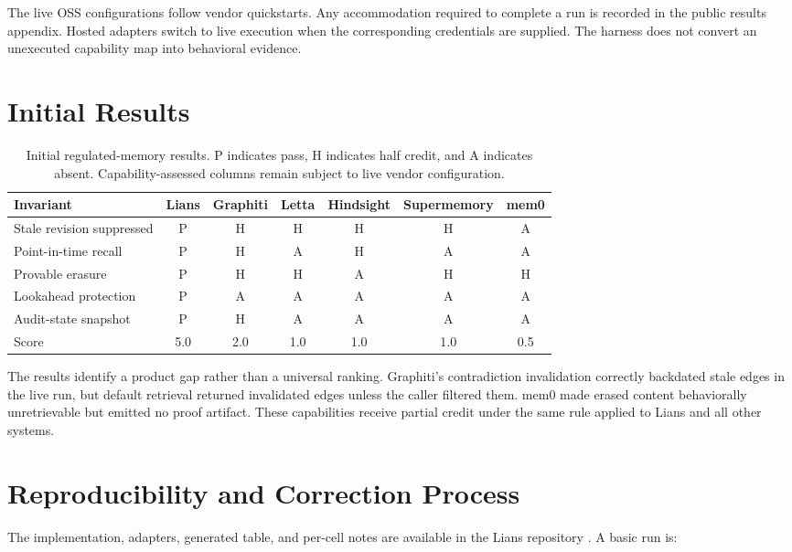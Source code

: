 \documentclass[10pt]{article}
\begin{document}
The live OSS configurations follow vendor quickstarts. Any accommodation required to
complete a run is recorded in the public results appendix. Hosted adapters switch to
live execution when the corresponding credentials are supplied. The harness does not
convert an unexecuted capability map into behavioral evidence.

\section{Initial Results}

\begin{table}[t]
\centering
\caption{Initial regulated-memory results. P indicates pass, H indicates half credit,
and A indicates absent. Capability-assessed columns remain subject to live vendor
configuration.}
\label{tab:results}
\begin{tabularx}{\textwidth}{Xcccccc}
\toprule
Invariant & Lians & Graphiti & Letta & Hindsight & Supermemory & mem0 \\
\midrule
Stale revision suppressed & P & H & H & H & H & A \\
Point-in-time recall & P & H & A & H & A & A \\
Provable erasure & P & H & H & A & H & H \\
Lookahead protection & P & A & A & A & A & A \\
Audit-state snapshot & P & H & A & A & A & A \\
\midrule
Score & 5.0 & 2.0 & 1.0 & 1.0 & 1.0 & 0.5 \\
\bottomrule
\end{tabularx}
\end{table}

The results identify a product gap rather than a universal ranking. Graphiti's
contradiction invalidation correctly backdated stale edges in the live run, but
default retrieval returned invalidated edges unless the caller filtered them. mem0
made erased content behaviorally unretrievable but emitted no proof artifact. These
capabilities receive partial credit under the same rule applied to Lians and all
other systems.

\section{Reproducibility and Correction Process}

The implementation, adapters, generated table, and per-cell notes are available in
the Lians repository \cite{lians2026}. A basic run is:
\end{document}
